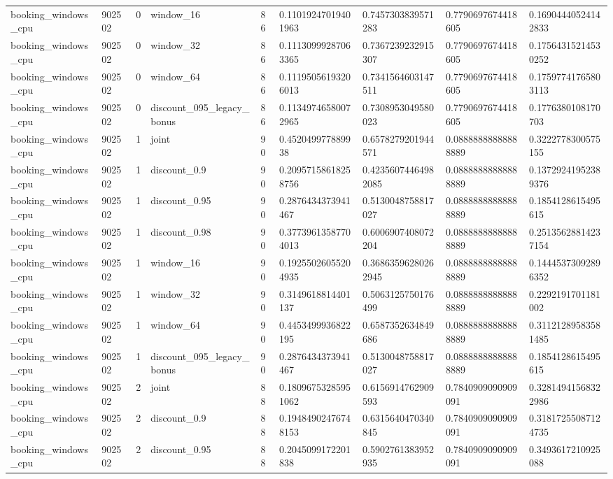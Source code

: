 \begin{tabular}{lllllllll}
booking\_windows\_cpu & 902502 & 0 & window\_16 & 86 & 0.11019247019401963 & 0.7457303839571283 & 0.7790697674418605 & 0.16904440524142833 \\
booking\_windows\_cpu & 902502 & 0 & window\_32 & 86 & 0.11130999287063365 & 0.7367239232915307 & 0.7790697674418605 & 0.17564315214530252 \\
booking\_windows\_cpu & 902502 & 0 & window\_64 & 86 & 0.11195056193206013 & 0.7341564603147511 & 0.7790697674418605 & 0.17597741765803113 \\
booking\_windows\_cpu & 902502 & 0 & discount\_095\_legacy\_bonus & 86 & 0.11349746580072965 & 0.7308953049580023 & 0.7790697674418605 & 0.1776380108170703 \\
booking\_windows\_cpu & 902502 & 1 & joint & 90 & 0.452049977889938 & 0.6578279201944571 & 0.08888888888888889 & 0.3222778300575155 \\
booking\_windows\_cpu & 902502 & 1 & discount\_0.9 & 90 & 0.20957158618258756 & 0.42356074464982085 & 0.08888888888888889 & 0.13729241952389376 \\
booking\_windows\_cpu & 902502 & 1 & discount\_0.95 & 90 & 0.2876434373941467 & 0.5130048758817027 & 0.08888888888888889 & 0.1854128615495615 \\
booking\_windows\_cpu & 902502 & 1 & discount\_0.98 & 90 & 0.37739613587704013 & 0.6006907408072204 & 0.08888888888888889 & 0.25135628814237154 \\
booking\_windows\_cpu & 902502 & 1 & window\_16 & 90 & 0.19255026055204935 & 0.36863596280262945 & 0.08888888888888889 & 0.14445373092896352 \\
booking\_windows\_cpu & 902502 & 1 & window\_32 & 90 & 0.3149618814401137 & 0.5063125750176499 & 0.08888888888888889 & 0.2292191701181002 \\
booking\_windows\_cpu & 902502 & 1 & window\_64 & 90 & 0.4453499936822195 & 0.6587352634849686 & 0.08888888888888889 & 0.31121289583581485 \\
booking\_windows\_cpu & 902502 & 1 & discount\_095\_legacy\_bonus & 90 & 0.2876434373941467 & 0.5130048758817027 & 0.08888888888888889 & 0.1854128615495615 \\
booking\_windows\_cpu & 902502 & 2 & joint & 88 & 0.18096753285951062 & 0.6156914762909593 & 0.7840909090909091 & 0.32814941568322986 \\
booking\_windows\_cpu & 902502 & 2 & discount\_0.9 & 88 & 0.19484902476748153 & 0.6315640470340845 & 0.7840909090909091 & 0.31817255087124735 \\
booking\_windows\_cpu & 902502 & 2 & discount\_0.95 & 88 & 0.2045099172201838 & 0.5902761383952935 & 0.7840909090909091 & 0.3493617210925088 \\

\end{tabular}
